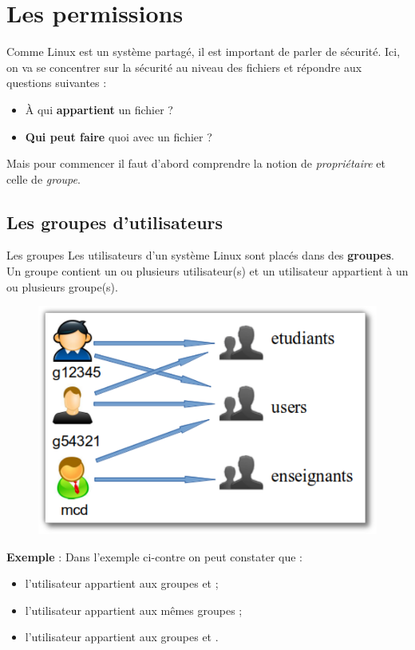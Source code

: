 \documentclass[a4paper,11pt]{style-esi/td}
\begin{document}
\entete
\titre
{}
\lastedit

\bigskip
\tableofcontents
\newpage

\section{Les permissions}

	Comme Linux est un système partagé, il est important de parler de sécurité. 
	Ici, on va se concentrer sur la sécurité au niveau des fichiers 
	et répondre aux questions suivantes :  
	\begin{itemize}
	\item À qui \textbf{appartient} un fichier ?
	\item \textbf{Qui peut faire} quoi avec un fichier ?
	\end{itemize}

	Mais pour commencer il faut d'abord comprendre 
	la notion de \textit{propriétaire}
	et celle de \textit{groupe}. 

	\subsection{Les groupes d'utilisateurs}

		\begin{theorie}{Les groupes}
			Les utilisateurs d'un système Linux sont placés dans des \textbf{groupes}. 
			Un groupe contient un ou plusieurs utilisateur(s) 
			et un utilisateur appartient à un ou plusieurs groupe(s).
		\end{theorie}

		\begin{figure}
			\vspace{-1em}
			\includegraphics[width=.3\textwidth]{image/groupes.pdf}
			\vspace{-3em}
		\end{figure}
		\textbf{Exemple} :
		Dans l'exemple ci-contre on peut constater que :
		\begin{itemize}
		\item 
			l'utilisateur  appartient 
			aux groupes  et  ;
		\item 
			l'utilisateur  appartient aux mêmes groupes ;
		\item 
			l'utilisateur  appartient 
			aux groupes  et .
		\end{itemize}
		
\end{document}

